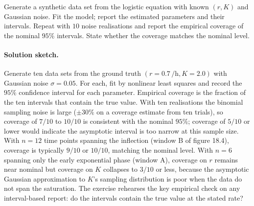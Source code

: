 \begin{exercise}
Generate a synthetic data set from the logistic equation with
known $(r, K)$ and Gaussian noise. Fit the model; report the
estimated parameters and their intervals. Repeat with $10$
noise realisations and report the empirical coverage of the
nominal $95\%$ intervals. State whether the coverage matches
the nominal level.

\paragraph{Solution sketch.} Generate ten data sets from the
ground truth $(r = 0.7\,\si{\per\hour}, K = 2.0)$ with Gaussian
noise $\sigma = 0.05$. For each, fit by nonlinear least squares
and record the $95\%$ confidence interval for each parameter.
Empirical coverage is the fraction of the ten intervals that
contain the true value. With ten realisations the binomial
sampling noise is large ($\pm 30\%$ on a coverage estimate from
ten trials), so coverage of $7/10$ to $10/10$ is consistent with
the nominal $95\%$; coverage of $5/10$ or lower would indicate
the asymptotic interval is too narrow at this sample size. With
$n = 12$ time points spanning the inflection (window B of
figure 18.4), coverage is typically $9/10$ or $10/10$, matching
the nominal level. With $n = 6$ spanning only the early
exponential phase (window A), coverage on $r$ remains near
nominal but coverage on $K$ collapses to $3/10$ or less, because
the asymptotic Gaussian approximation to $K$'s sampling
distribution is poor when the data do not span the saturation.
The exercise rehearses the key empirical check on any
interval-based report: do the intervals contain the true value at
the stated rate?
\end{exercise}

